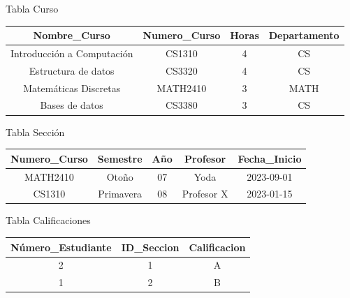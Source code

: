 \documentclass[a4paper,12pt]{article}
\begin{document}
\begin{enumerate}
    \vspace{10mm}
  
    \begin{minipage}[c]{0.75\textwidth}        
      Tabla Curso  \\
  
        \begin{tabular}{|c|c|c|c|}
          \hline
            Nombre\_Curso & Numero\_Curso & Horas & Departamento \\
          \hline
            Introducción a Computación & CS1310 & 4 & CS \\
            Estructura de datos & CS3320 & 4 & CS \\
            Matemáticas Discretas & MATH2410 & 3 & MATH \\
            Bases de datos & CS3380 & 3 & CS \\
          \hline
        \end{tabular}
    \end{minipage}
  
    \vspace{10mm}
  
    \begin{minipage}[c]{0.75\textwidth}        
      Tabla Sección \\
  
        \begin{tabular}{|c|c|c|c|c|}
        \hline
          Numero\_Curso & Semestre & Año & Profesor & Fecha\_Inicio \\ \hline
          MATH2410 & Otoño & 07 & Yoda & 2023-09-01 \\
          CS1310 & Primavera & 08 & Profesor X & 2023-01-15 \\
        \hline
        \end{tabular}
    \end{minipage}
  
    \vspace{10mm}
  
    \begin{minipage}[c]{0.75\textwidth}        
        Tabla Calificaciones \\
  
        \begin{tabular}{|c|c|c|}
        \hline
          Número\_Estudiante & ID\_Seccion & Calificacion \\ \hline
          2 & 1 & A \\
          1 & 2 & B \\
        \hline
        \end{tabular}
    \end{minipage}
  

\end{enumerate}
\end{document}
